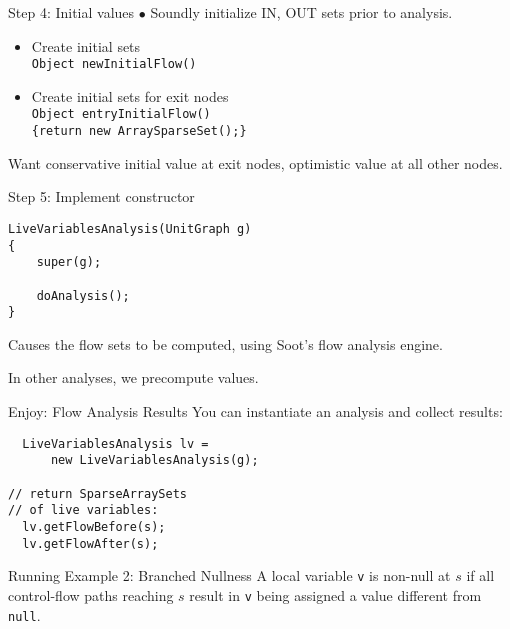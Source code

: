 \begin{slide}{Step 4: Initial values}
\vspace*{-0.15in}
$\bullet$ Soundly initialize IN, OUT sets prior to analysis.

\vspace*{-0.1in}
\begin{itemize}
\item Create initial sets\\
{\tt Object newInitialFlow()}\\

\item Create initial sets for exit nodes\\
{\tt Object entryInitialFlow() \\ 
\qquad \{return new ArraySparseSet();\} }

\end{itemize}

Want conservative initial value at exit nodes, optimistic
value at all other nodes.
\end{slide}

\begin{slide}{Step 5: Implement constructor}
\begin{verbatim}
LiveVariablesAnalysis(UnitGraph g)
{
    super(g);

    doAnalysis();
}
\end{verbatim}
Causes the flow sets to be computed, using Soot's flow
analysis engine.

\quad

In other analyses, we precompute values.
\end{slide}

\begin{slide}{Enjoy: Flow Analysis Results}
You can instantiate an analysis and collect
results:
\begin{verbatim}
  LiveVariablesAnalysis lv = 
      new LiveVariablesAnalysis(g);

// return SparseArraySets
// of live variables:
  lv.getFlowBefore(s);
  lv.getFlowAfter(s);
\end{verbatim}
\end{slide}


\begin{slide}{Running Example 2: Branched Nullness}
\vspace*{-0.2in} 
A local variable {\tt v} is {\red non-null} at $s$ if all
control-flow paths reaching $s$ result in {\tt v} being
assigned a value different from {\tt null}.

\begin{center}
\scalebox{0.95}{}
\end{center}
\end{slide}

